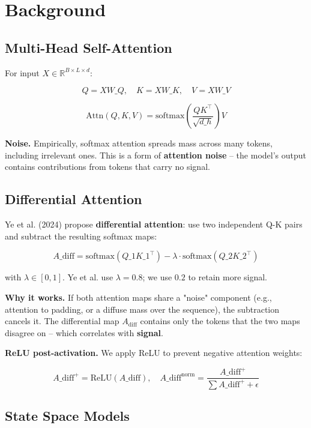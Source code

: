 \section{Background}

\subsection{Multi-Head Self-Attention}

For input $X \in \mathbb{R}^{B \times L \times d}$:

\[
Q = X W\_Q, \quad K = X W\_K, \quad V = X W\_V
\tag{3.1}
\]

\[
\text{Attn}(Q, K, V) = \text{softmax}\!\left(\frac{Q K^\top}{\sqrt{d\_h}}\right) V
\tag{3.2}
\]

\textbf{Noise.} Empirically, softmax attention spreads mass across many tokens, 
including irrelevant ones. This is a form of \textbf{attention noise} -- the 
model's output contains contributions from tokens that carry no signal.

\subsection{Differential Attention}

Ye et al. (2024) propose \textbf{differential attention}: use two independent 
Q-K pairs and subtract the resulting softmax maps:

\[
A\_\text{diff} = \text{softmax}(Q\_1 K\_1^\top) - \lambda \cdot \text{softmax}(Q\_2 K\_2^\top)
\tag{3.3}
\]

with $\lambda \in [0, 1]$. Ye et al. use $\lambda = 0.8$; we use $0.2$ to 
retain more signal.

\textbf{Why it works.} If both attention maps share a "noise" component (e.g., 
attention to padding, or a diffuse mass over the sequence), the subtraction 
cancels it. The differential map $A_\text{diff}$ contains only the tokens 
that the two maps disagree on -- which correlates with \textbf{signal}.

\textbf{ReLU post-activation.} We apply ReLU to prevent negative attention 
weights:

\[
A\_\text{diff}^+ = \text{ReLU}(A\_\text{diff}), \quad
A\_\text{diff}^\text{norm} = \frac{A\_\text{diff}^+}{\sum A\_\text{diff}^+ + \epsilon}
\tag{3.4}
\]

\subsection{State Space Models}

